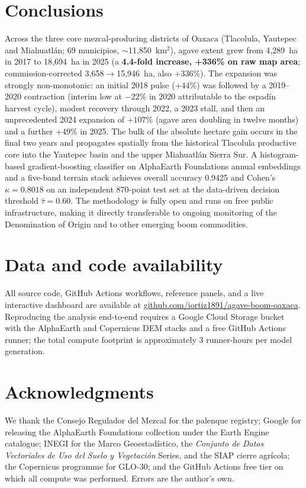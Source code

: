 \documentclass[10pt,a4paper]{article}
\begin{document}
\section{Conclusions}\label{sec:conclusions}

Across the three core mezcal-producing districts of Oaxaca
(Tlacolula, Yautepec and Miahuatlán; 69 municipios,
$\sim$11{,}850~km$^2$), agave extent grew from 4{,}289~ha in 2017
to 18{,}694~ha in 2025 (a \textbf{4.4-fold increase, +336\% on raw
map area}; commission-corrected
3{,}658$\rightarrow$15{,}946~ha, also $+336\%$). The expansion was
strongly non-monotonic: an initial 2018 pulse ($+44\%$) was
followed by a 2019--2020 contraction (interim low at $-22\%$ in
2020 attributable to the espad\'in harvest cycle), modest recovery
through 2022, a 2023 stall, and then an unprecedented 2024
expansion of \textbf{$+107\%$} (agave area doubling in twelve
months) and a further $+49\%$ in 2025. The bulk of the absolute
hectare gain occurs in the final two years and propagates spatially
from the historical Tlacolula productive core into the Yautepec
basin and the upper Miahuatlán Sierra Sur. A histogram-based
gradient-boosting classifier on AlphaEarth Foundations annual
embeddings and a five-band terrain stack achieves overall accuracy
0.9425 and Cohen's $\kappa = 0.8018$ on an independent 870-point
test set at the data-driven decision threshold $\hat{\tau} = 0.60$.
The methodology is fully open and runs on free public
infrastructure, making it directly transferable to ongoing
monitoring of the Denomination of Origin and to other emerging
boom commodities.

\section*{Data and code availability}

All source code, GitHub Actions workflows, reference panels, and a
live interactive dashboard are available at
\href{https://github.com/iortiz1891/agave-boom-oaxaca}{github.com/iortiz1891/agave-boom-oaxaca}.
Reproducing the analysis end-to-end requires a Google Cloud Storage
bucket with the AlphaEarth and Copernicus DEM stacks and a free
GitHub Actions runner; the total compute footprint is approximately
3 runner-hours per model generation.

\section*{Acknowledgments}

We thank the Consejo Regulador del Mezcal for the palenque registry;
Google for releasing the AlphaEarth Foundations collection under the
Earth Engine catalogue; INEGI for the Marco Geoestad\'istico, the
\textit{Conjunto de Datos Vectoriales de Uso del Suelo y Vegetaci\'on}
Series, and the SIAP cierre agr\'icola; the Copernicus programme for
GLO-30; and the GitHub Actions free tier on which all compute was
performed. Errors are the author's own.


\end{document}
